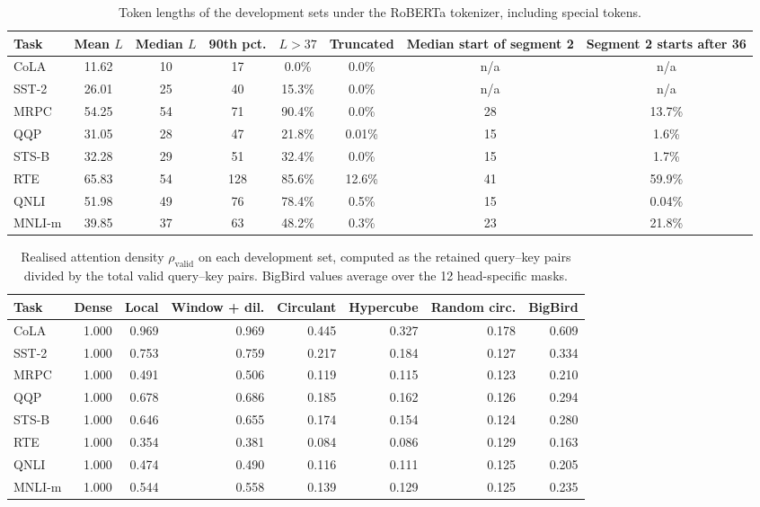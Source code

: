 \documentclass[10pt]{article}
\begin{document}
\begin{table}[H]
\centering
\caption{Token lengths of the development sets under the RoBERTa tokenizer, including special tokens.}
\label{tab:lengths}
\scriptsize
\begin{tabular}{lccccccc}
\toprule
Task & Mean $L$ & Median $L$ & 90th pct. & $L>37$ & Truncated & Median start of segment 2 & Segment 2 starts after 36 \\
\midrule
CoLA & 11.62 & 10 & 17 & 0.0\% & 0.0\% & n/a & n/a \\
SST-2 & 26.01 & 25 & 40 & 15.3\% & 0.0\% & n/a & n/a \\
MRPC & 54.25 & 54 & 71 & 90.4\% & 0.0\% & 28 & 13.7\% \\
QQP & 31.05 & 28 & 47 & 21.8\% & 0.01\% & 15 & 1.6\% \\
STS-B & 32.28 & 29 & 51 & 32.4\% & 0.0\% & 15 & 1.7\% \\
RTE & 65.83 & 54 & 128 & 85.6\% & 12.6\% & 41 & 59.9\% \\
QNLI & 51.98 & 49 & 76 & 78.4\% & 0.5\% & 15 & 0.04\% \\
MNLI-m & 39.85 & 37 & 63 & 48.2\% & 0.3\% & 23 & 21.8\% \\
\bottomrule
\end{tabular}
\end{table}

\begin{table}[H]
\centering
\caption{Realised attention density $\rho_{\mathrm{valid}}$ on each development set, computed as the retained query--key pairs divided by the total valid query--key pairs. BigBird values average over the 12 head-specific masks.}
\label{tab:pilotdensity}
\scriptsize
\setlength{\tabcolsep}{4pt}
\begin{tabular}{lrrrrrrr}
\toprule
Task & Dense & Local & Window + dil. & Circulant & Hypercube & Random circ. & BigBird \\
\midrule
CoLA & 1.000 & 0.969 & 0.969 & 0.445 & 0.327 & 0.178 & 0.609 \\
SST-2 & 1.000 & 0.753 & 0.759 & 0.217 & 0.184 & 0.127 & 0.334 \\
MRPC & 1.000 & 0.491 & 0.506 & 0.119 & 0.115 & 0.123 & 0.210 \\
QQP & 1.000 & 0.678 & 0.686 & 0.185 & 0.162 & 0.126 & 0.294 \\
STS-B & 1.000 & 0.646 & 0.655 & 0.174 & 0.154 & 0.124 & 0.280 \\
RTE & 1.000 & 0.354 & 0.381 & 0.084 & 0.086 & 0.129 & 0.163 \\
QNLI & 1.000 & 0.474 & 0.490 & 0.116 & 0.111 & 0.125 & 0.205 \\
MNLI-m & 1.000 & 0.544 & 0.558 & 0.139 & 0.129 & 0.125 & 0.235 \\
\bottomrule
\end{tabular}
\end{table}
\end{document}
